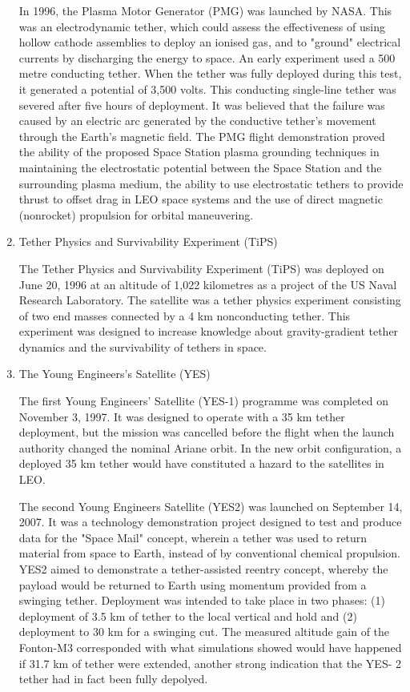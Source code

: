 \begin{enumerate}
In 1996, the Plasma Motor Generator (PMG) was launched by NASA. This was an electrodynamic tether, which could assess the effectiveness of using hollow cathode assemblies to deploy an ionised gas, and to "ground" electrical currents by discharging the energy to space. An early experiment used a 500 metre conducting tether. When the tether was fully deployed during this test, it generated a potential of 3,500 volts. This conducting single-line tether was severed after five hours of deployment. It was believed that the failure was caused by an electric arc generated by the conductive tether's movement through the Earth's magnetic field. The PMG flight demonstration proved the ability of the proposed Space Station plasma grounding techniques in maintaining the electrostatic potential between the Space Station and the surrounding plasma medium, the ability to use electrostatic tethers to provide thrust to offset drag in LEO space systems and the use of direct magnetic (nonrocket) propulsion for orbital maneuvering.
\item{Tether Physics and Survivability Experiment (TiPS)}

The Tether Physics and Survivability Experiment (TiPS) was deployed on June 20, 1996 at an altitude of 1,022 kilometres as a project of the US Naval Research Laboratory. The satellite was a tether physics experiment consisting of two end masses connected by a 4 km nonconducting tether. This experiment was designed to increase knowledge about gravity-gradient tether dynamics and the survivability of tethers in space.

\item{The Young Engineers's Satellite (YES)}

The first Young Engineers' Satellite (YES-1) programme was completed on November 3, 1997. It was designed to operate with a 35 km tether deployment, but the mission was cancelled before the flight when the launch authority changed the nominal Ariane orbit. In the new orbit configuration, a deployed 35 km tether would have constituted a hazard to the satellites in LEO.

The second Young Engineers Satellite (YES2) was launched on September 14, 2007. It was a technology demonstration project designed to test and produce data for the "Space Mail" concept, wherein a tether was used to return material from space to Earth, instead of by conventional chemical
propulsion. YES2 aimed to demonstrate a tether-assisted reentry concept, whereby the payload would be returned to Earth using momentum provided from a swinging tether. Deployment was intended to take place in two phases: (1) deployment of 3.5 km of tether to the local vertical and hold and (2) deployment to 30 km for a swinging cut. The measured altitude gain of the Fonton-M3 corresponded with what simulations showed would have happened if 31.7 km of tether were extended, another strong indication that the YES- 2 tether had in fact been fully depolyed.



\end{enumerate}
